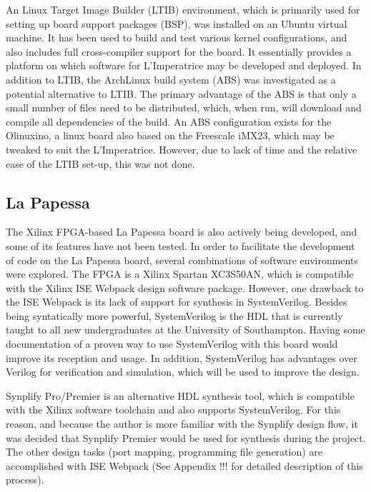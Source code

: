 		An Linux Target Image Builder (LTIB)  environment, which is primarily used for setting up board support packages (BSP), was installed on an Ubuntu virtual machine.  It has been used to build and test various kernel configurations, and also includes full cross-compiler support for the board.  It essentially provides a platform on which software for L'Imperatrice may be developed and deployed.
		In addition to LTIB, the ArchLinux build system (ABS) was investigated as a potential alternative to LTIB.  The primary advantage of the ABS is that only a small number of files need to be distributed, which, when run, will download and compile all dependencies of the build.  An ABS configuration exists for the Olinuxino, a linux board also based on the Freescale iMX23, which may be tweaked to suit the L'Imperatrice.  However, due to lack of time and the relative ease of the LTIB set-up, this was not done.

	\subsection{La Papessa} %
	\label{sub:la_papessa_env}
		The Xilinx FPGA-based La Papessa board is also actively being developed, and some of its features have not been tested.  In order to facilitate the development of code on the La Papessa board, several combinations of software environments were explored.  The FPGA is a Xilinx Spartan XC3S50AN, which is compatible with the Xilinx ISE Webpack design software package.  However, one drawback to the ISE Webpack is its lack of support for synthesis in SystemVerilog. Besides being syntatically more powerful, SystemVerilog is the HDL that is currently taught to all new undergraduates at the University of Southampton. Having some documentation of a proven way to use SystemVerilog with this board would improve its reception and usage. In addition, SystemVerilog has advantages over Verilog for verification and simulation, which will be used to improve the design.

		Synplify Pro/Premier is an alternative HDL synthesis tool, which is compatible with the Xilinx software toolchain and also supports SystemVerilog. For this reason, and because the author is more familiar with the Synplify design flow, it was decided that Synplify Premier would be used for synthesis during the project.  The other design tasks (port mapping, programming file generation) are accomplished with ISE Webpack (See Appendix !!! for detailed description of this process).



